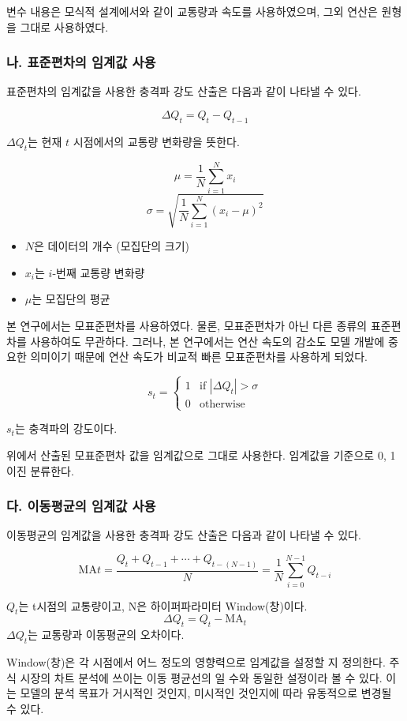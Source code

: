 \documentclass[11pt]{report}
\begin{document}
변수 내용은 모식적 설계에서와 같이 교통량과 속도를 사용하였으며, 그외 연산은 원형을 그대로 사용하였다. 

\subsubsection*{나. 표준편차의 임계값 사용}
표준편차의 임계값을 사용한 충격파 강도 산출은 다음과 같이 나타낼 수 있다. 

$$
\Delta Q_t = Q_t - Q_{t-1}
$$

$\Delta Q_t$는 현재 $t$ 시점에서의 교통량 변화량을 뜻한다. 

$$
\mu = \frac{1}{N} \sum_{i=1}^{N} x_i
$$
$$
\sigma = \sqrt{\frac{1}{N} \sum_{i=1}^{N} (x_i - \mu)^2}
$$

\begin{itemize}
    \item $N$은 데이터의 개수 (모집단의 크기)
    \item $x_i$는 $i$-번째 교통량 변화량
    \item $\mu$는 모집단의 평균
\end{itemize}

본 연구에서는 모표준편차를 사용하였다. 
물론, 모표준편차가 아닌 다른 종류의 표준편차를 사용하여도 무관하다. 
그러나, 본 연구에서는 연산 속도의 감소도 모델 개발에 중요한 의미이기 때문에 연산 속도가 비교적 빠른 모표준편차를 사용하게 되었다. 

$$
s_t = \begin{cases}
	1 & \text{if } |\Delta Q_t| > \sigma \\
	0 & \text{otherwise}
	\end{cases}
$$

$s_t$는 충격파의 강도이다. 

위에서 산출된 모표준편차 값을 임계값으로 그대로 사용한다. 
임계값을 기준으로 0, 1 이진 분류한다. 

\subsubsection*{다. 이동평균의 임계값 사용}
이동평균의 임계값을 사용한 충격파 강도 산출은 다음과 같이 나타낼 수 있다. 

$$
\text{MA}t = \frac{Q_t + Q_{t-1} + \cdots + Q_{t-(N-1)}}{N} = \frac{1}{N} \sum_{i=0}^{N-1} Q_{t-i}
$$

$Q_t$는 t시점의 교통량이고, N은 하이퍼파라미터 Window(창)이다. 
$$
\Delta Q_t = Q_t - \text{MA}_t
$$
$\Delta Q_t$는 교통량과 이동평균의 오차이다. 

Window(창)은 각 시점에서 어느 정도의 영향력으로 임계값을 설정할 지 정의한다. 
주식 시장의 차트 분석에 쓰이는 이동 평균선의 일 수와 동일한 설정이라 볼 수 있다. 
이는 모델의 분석 목표가 거시적인 것인지, 미시적인 것인지에 따라 유동적으로 변경될 수 있다. 
\end{document}

